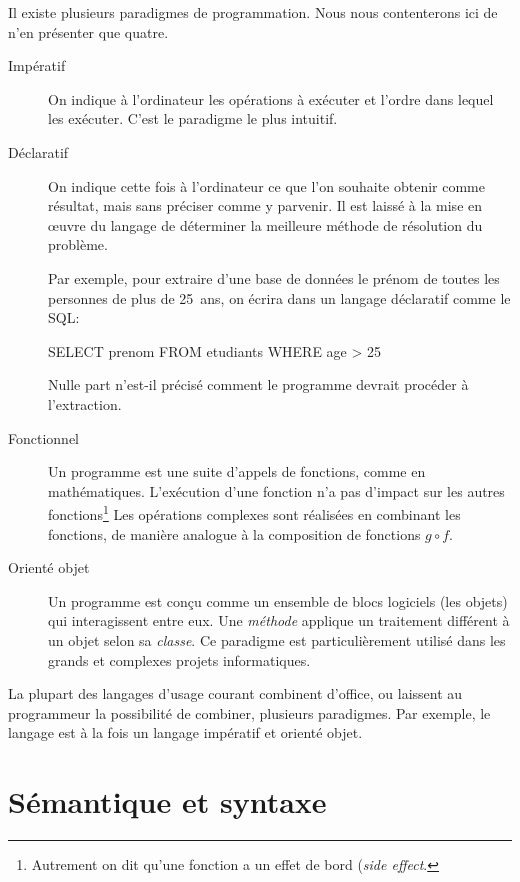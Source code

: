 Il existe plusieurs paradigmes de programmation. Nous nous
contenterons ici de n'en présenter que quatre.

\begin{description}
\item[Impératif]  On indique à l'ordinateur
  les opérations à exécuter et l'ordre dans lequel les exécuter. C'est
  le paradigme le plus intuitif.
\item[Déclaratif]  On indique cette fois à
  l'ordinateur ce que l'on souhaite obtenir comme résultat, mais sans
  préciser comme y parvenir. Il est laissé à la mise en œuvre du
  langage de déterminer la meilleure méthode de résolution du
  problème.

  Par exemple, pour extraire d'une base de données  le
  prénom de toutes les personnes de plus de 25~ans, on écrira dans un
  langage déclaratif comme le SQL:
\begin{Schunk}
\begin{Sinput}
SELECT prenom FROM etudiants WHERE age > 25
\end{Sinput}
\end{Schunk}
  Nulle part n'est-il précisé comment le programme devrait procéder à
  l'extraction.
\item[Fonctionnel]  Un programme est une
  suite d'appels de fonctions, comme en mathématiques. L'exécution
  d'une fonction n'a pas d'impact sur les autres fonctions\footnote{%
    Autrement on dit qu'une fonction a un effet de bord (\emph{side
      effect}.} %
  Les opérations complexes sont réalisées en combinant les fonctions,
  de manière analogue à la composition de fonctions $g \circ f$.
\item[Orienté objet]  Un programme est
  conçu comme un ensemble de blocs logiciels (les objets) qui
  interagissent entre eux. Une \emph{méthode} applique un traitement
  différent à un objet selon sa \emph{classe}. Ce paradigme est
  particulièrement utilisé dans les grands et complexes projets
  informatiques.
\end{description}

La plupart des langages d'usage courant combinent d'office, ou
laissent au programmeur la possibilité de combiner, plusieurs
paradigmes. Par exemple, le langage {\Cpp} est à la fois un langage
impératif et orienté objet.


\section{Sémantique et syntaxe}
\label{sec:informatique:semantique}

